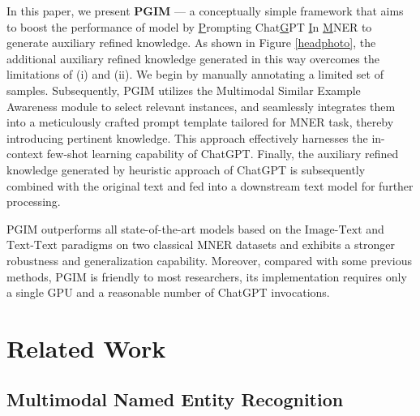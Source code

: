 \documentclass[11pt]{article}
\begin{document}
In this paper, we present \textbf{PGIM} --- a conceptually simple framework that aims to boost the performance of model by \underline{P}rompting Chat\underline{G}PT \underline{I}n \underline{M}NER to generate auxiliary refined knowledge. 
As shown in Figure \ref{headphoto}, the additional auxiliary refined knowledge generated in this way overcomes the limitations of (i) and (ii). 
We begin by manually annotating a limited set of samples. Subsequently, PGIM utilizes the Multimodal Similar Example Awareness module to select relevant instances, and seamlessly integrates them into a meticulously crafted prompt template tailored for MNER task, thereby introducing pertinent knowledge. This approach effectively harnesses the in-context few-shot learning capability of ChatGPT. Finally, the auxiliary refined knowledge generated by heuristic approach of ChatGPT is subsequently combined with the original text and fed into a downstream text model for further processing. 

PGIM outperforms all state-of-the-art models based on the $\text{Image-Text}$ and $\text{Text-Text}$ paradigms on two classical MNER datasets and exhibits a stronger robustness and generalization capability. Moreover, compared with some previous methods, PGIM is friendly to most researchers, its implementation requires only a single GPU and a reasonable number of ChatGPT invocations.


\section{Related Work}
\subsection{Multimodal Named Entity Recognition}
\end{document}
